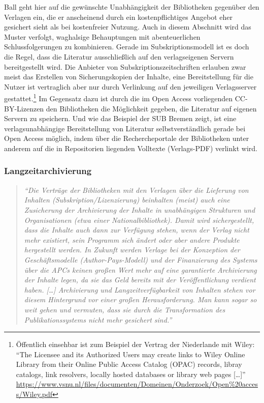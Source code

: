 \documentclass[a4paper,
fontsize=11pt,
oneside,
numbers=noperiodatend,
parskip=half-,
bibliography=totoc,
final
]{scrartcl}
\begin{document}
Ball geht hier auf die gewünschte Unabhängigkeit der Bibliotheken
gegenüber den Verlagen ein, die er anscheinend durch ein
kostenpflichtiges Angebot eher gesichert sieht als bei kostenfreier
Nutzung. Auch in diesem Abschnitt wird das Muster verfolgt, waghalsige
Behauptungen mit abenteuerlichen Schlussfolgerungen zu kombinieren.
Gerade im Subskriptionsmodell ist es doch die Regel, dass die Literatur
ausschließlich auf den verlagseigenen Servern bereitgestellt wird. Die
Anbieter von Subskriptionszeitschriften erlauben zwar meist das
Erstellen von Sicherungskopien der Inhalte, eine Bereitstellung für die
Nutzer ist vertraglich aber nur durch Verlinkung auf den jeweiligen
Verlagsserver gestattet.\footnote{Öffentlich einsehbar ist zum Beispiel
  der Vertrag der Niederlande mit Wiley: \enquote{The Licensee and its
  Authorized Users may create links to Wiley Online Library from their
  Online Public Access Catalog (OPAC) records, libray catalogs, link
  resolvers, locally hosted databases or library web pages
  {[}\ldots{}{]}}
  \url{https://www.vsnu.nl/files/documenten/Domeinen/Onderzoek/Open\%20access/Wiley.pdf}}
Im Gegensatz dazu ist durch die im Open Access vorliegenden
CC-BY-Lizenzen den Bibliotheken die Möglichkeit gegeben, die Literatur
auf eigenen Servern zu speichern. Und wie das Beispiel der SUB Bremen
zeigt, ist eine verlagsunabhängige Bereitstellung von Literatur
selbstverständlich gerade bei Open Access möglich, indem über die
Rechercheportale der Bibliotheken unter anderem auf die in Repositorien
liegenden Volltexte (Verlags-PDF) verlinkt wird.

\hypertarget{langzeitarchivierung}{%
\subsubsection{Langzeitarchivierung}\label{langzeitarchivierung}}

\begin{quote}
\emph{\enquote{Die Verträge der Bibliotheken mit den Verlagen über die
Lieferung von Inhalten (Subskription/Lizenzierung) beinhalten (meist)
auch eine Zusicherung der Archivierung der Inhalte in unabhängigen
Strukturen und Organisationen (etwa einer Nationalbibliothek). Damit
wird sichergestellt, dass die Inhalte auch dann zur Verfügung stehen,
wenn der Verlag nicht mehr existiert, sein Programm sich ändert oder
aber andere Produkte hergestellt werden. In Zukunft werden Verlage bei
der Konzeption der Geschäftsmodelle (Author-Pays-Modell) und der
Finanzierung des Systems über die APCs keinen großen Wert mehr auf eine
garantierte Archivierung der Inhalte legen, da sie das Geld bereits mit
der Veröffentlichung verdient haben. {[}\ldots{}{]} Archivierung und
Langzeitverfügbarkeit von Inhalten stehen vor diesem Hintergrund vor
einer großen Herausforderung. Man kann sogar so weit gehen und vermuten,
dass sie durch die Transformation des Publikationssystems nicht mehr
gesichert sind.}}
\end{quote}
\end{document}
